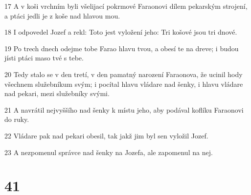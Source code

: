 \par 17 A v koši vrchním byli všelijací pokrmové Faraonovi dílem pekarským strojení, a ptáci jedli je z koše nad hlavou mou.
\par 18 I odpovedel Jozef a rekl: Toto jest vyložení jeho: Tri košové jsou tri dnové.
\par 19 Po trech dnech odejme tobe Farao hlavu tvou, a obesí te na dreve; i budou jísti ptáci maso tvé s tebe.
\par 20 Tedy stalo se v den tretí, v den pamatný narození Faraonova, že ucinil hody všechnem služebníkum svým; i pocítal hlavu vládare nad šenky, i hlavu vládare nad pekari, mezi služebníky svými.
\par 21 A navrátil nejvyššího nad šenky k místu jeho, aby podával koflíku Faraonovi do ruky.
\par 22 Vládare pak nad pekari obesil, tak jakž jim byl sen vyložil Jozef.
\par 23 A nezpomenul správce nad šenky na Jozefa, ale zapomenul na nej.

\chapter{41}

